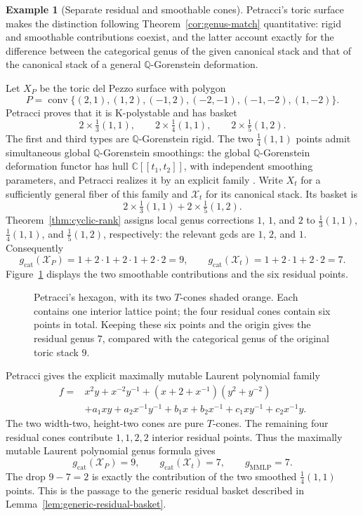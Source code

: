 \documentclass[11pt]{article}
\theoremstyle{plain}
\theoremstyle{definition}
\newtheorem{example}[theorem]{Example}
\theoremstyle{remark}
\newcommand{\C}{\mathbb C}
\newcommand{\Q}{\mathbb Q}
\newcommand{\1}{\mathbf 1}
\begin{document}
\begin{example}[Separate residual and smoothable cones]\label{ex:petracci-drop}
Petracci's toric surface makes the distinction following Theorem~\ref{cor:genus-match} quantitative: rigid and smoothable contributions coexist, and the latter account exactly for the difference between the categorical genus of the given canonical stack and that of the canonical stack of a general $\Q$-Gorenstein deformation.

Let $X_P$ be the toric del Pezzo surface with polygon
\[
P=\operatorname{conv}\{(2,1),(1,2),(-1,2),(-2,-1),(-1,-2),(1,-2)\}.
\]
Petracci \cite[Proposition 2.1]{PetracciKmoduli} proves that it is K-polystable and has basket
\[
2\times\tfrac13(1,1),\qquad
2\times\tfrac14(1,1),\qquad
2\times\tfrac15(1,2).
\]
The first and third types are $\Q$-Gorenstein rigid.  The two $\frac14(1,1)$ points admit simultaneous global $\Q$-Gorenstein smoothings: the global $\Q$-Gorenstein deformation functor has hull $\C[\![t_1,t_2]\!]$, with independent smoothing parameters, and Petracci realizes it by an explicit family \cite[Section 2.2, equation (5), Proposition 2.3(B), and Section 2.5]{PetracciKmoduli}.  Write $X_t$ for a sufficiently general fiber of this family and $\mathcal X_t$ for its canonical stack.  Its basket is
\[
2\times\tfrac13(1,1)+2\times\tfrac15(1,2).
\]
Theorem~\ref{thm:cyclic-rank} assigns local genus corrections $1$, $1$, and $2$ to $\frac13(1,1)$, $\frac14(1,1)$, and $\frac15(1,2)$, respectively: the relevant gcds are $1$, $2$, and $1$.  Consequently
\[
g_{\mathrm{cat}}(\mathcal X_P)=1+2\cdot1+2\cdot1+2\cdot2=9,
\qquad
g_{\mathrm{cat}}(\mathcal X_t)=1+2\cdot1+2\cdot2=7.
\]
Figure~\ref{fig:petracci-hexagon} displays the two smoothable contributions and the six residual points.
\begin{figure}[htbp]
\centering

\caption{Petracci's hexagon, with its two $T$-cones shaded orange.  Each contains one interior lattice point; the four residual cones contain six points in total.  Keeping these six points and the origin gives the residual genus $7$, compared with the categorical genus of the original toric stack $9$.}
\label{fig:petracci-hexagon}
\end{figure}

Petracci \cite[Section 3.2]{PetracciKmoduli} gives the explicit maximally mutable Laurent polynomial family
\[
\begin{aligned}
f={}&x^2y+x^{-2}y^{-1}+(x+2+x^{-1})(y^2+y^{-2})\\
&+a_1xy+a_2x^{-1}y^{-1}+b_1x+b_2x^{-1}
+c_1xy^{-1}+c_2x^{-1}y.
\end{aligned}
\]
The two width-two, height-two cones are pure $T$-cones.  The remaining four residual cones contribute $1,1,2,2$ interior residual points.  Thus the maximally mutable Laurent polynomial genus formula \cite[Theorem 3.13]{CKPT} gives
\[
\boxed{g_{\mathrm{cat}}(\mathcal X_P)=9,\qquad
g_{\mathrm{cat}}(\mathcal X_t)=7,\qquad
g_{\mathrm{MMLP}}=7.}
\]
The drop $9-7=2$ is exactly the contribution of the two smoothed $\frac14(1,1)$ points.  This is the passage to the generic residual basket described in Lemma~\ref{lem:generic-residual-basket}.
\end{example}
\end{document}
